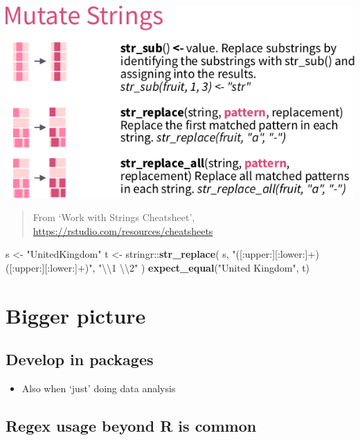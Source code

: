 \documentclass[]{book}
\newenvironment{Shaded}{}{}
\newcommand{\CharTok}[1]{\textcolor[rgb]{0.25,0.44,0.63}{#1}}
\newcommand{\KeywordTok}[1]{\textcolor[rgb]{0.00,0.44,0.13}{\textbf{#1}}}
\newcommand{\NormalTok}[1]{#1}
\newcommand{\OperatorTok}[1]{\textcolor[rgb]{0.40,0.40,0.40}{#1}}
\newcommand{\StringTok}[1]{\textcolor[rgb]{0.25,0.44,0.63}{#1}}
\providecommand{\tightlist}{%
  \setlength{\itemsep}{0pt}\setlength{\parskip}{0pt}}
\begin{document}
\includegraphics{06_mutate.png}

\begin{quote}
From `Work with Strings Cheatsheet', \url{https://rstudio.com/resources/cheatsheets}
\end{quote}

\begin{Shaded}
\begin{Highlighting}[]
\NormalTok{s <-}\StringTok{ "UnitedKingdom"}
\NormalTok{t <-}\StringTok{ }\NormalTok{stringr}\OperatorTok{::}\KeywordTok{str_replace}\NormalTok{(}
\NormalTok{  s, }
  \StringTok{"([:upper:][:lower:]+)([:upper:][:lower:]+)"}\NormalTok{, }
  \StringTok{"}\CharTok{\textbackslash{}\textbackslash{}}\StringTok{1 }\CharTok{\textbackslash{}\textbackslash{}}\StringTok{2"}
\NormalTok{)}
\KeywordTok{expect_equal}\NormalTok{(}\StringTok{"United Kingdom"}\NormalTok{, t)}
\end{Highlighting}
\end{Shaded}

\hypertarget{bigger-picture}{%
\chapter{Bigger picture}\label{bigger-picture}}

\hypertarget{develop-in-packages}{%
\section{Develop in packages}\label{develop-in-packages}}

\begin{itemize}
\tightlist
\item
  Also when `just' doing data analysis
\end{itemize}

\hypertarget{regex-usage-beyond-r-is-common}{%
\section{Regex usage beyond R is common}\label{regex-usage-beyond-r-is-common}}
\end{document}
